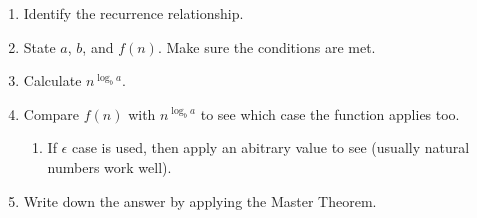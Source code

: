     \begin{process}
        \begin{enumerate}
            \item Identify the recurrence relationship.
            \item State $a$, $b$, and $f(n)$. Make sure the conditions are met.
            \item Calculate $n^{\log_b a}$. 
            \item Compare $f(n)$ with $n^{\log_b a}$ to see which case the function applies too.
            \begin{enumerate}
                \item If $\epsilon$ case is used, then apply an abitrary value to see (usually natural numbers work well).
            \end{enumerate}
            \item Write down the answer by applying the Master Theorem.
        \end{enumerate}
    \end{process}
    

